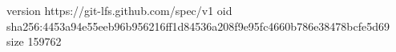 version https://git-lfs.github.com/spec/v1
oid sha256:4453a94e55eeb96b956216ff1d84536a208f9e95fc4660b786e38478bcfe5d69
size 159762
